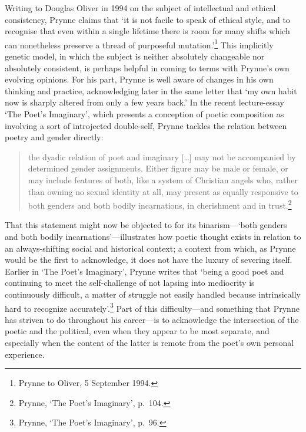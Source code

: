 \documentclass[]{article}
\begin{document}
Writing to Douglas Oliver in 1994 on the subject of intellectual and
ethical consistency, Prynne claims that ‘it is not facile to speak of
ethical style, and to recognise that even within a single lifetime there
is room for many shifts which can nonetheless preserve a thread of
purposeful mutation.’\footnote{Prynne to Oliver, 5 September 1994.} This
implicitly genetic model, in which the subject is neither absolutely
changeable nor absolutely consistent, is perhaps helpful in coming to
terms with Prynne’s own evolving opinions. For his part, Prynne is well
aware of changes in his own thinking and practice, acknowledging later
in the same letter that ‘my own habit now is sharply altered from only a
few years back.’ In the recent lecture-essay ‘The Poet’s Imaginary’,
which presents a conception of poetic composition as involving a sort of
introjected double-self, Prynne tackles the relation between poetry and
gender directly:

\begin{quote}
\singlespacing the dyadic relation of poet and imaginary {[}\ldots{}{]}
may not be accompanied by determined gender assignments. Either figure
may be male or female, or may include features of both, like a system of
Christian angels who, rather than owning no sexual identity at all, may
present as equally responsive to both genders and both bodily
incarnations, in cherishment and in trust.\footnote{Prynne, ‘The Poet’s
  Imaginary’, p.~104.}
\end{quote}

\noindent That this statement might now be objected to for its
binarism—‘both genders and both bodily incarnations’—illustrates how
poetic thought exists in relation to an always-shifting social and
historical context; a context from which, as Prynne would be the first
to acknowledge, it does not have the luxury of severing itself. Earlier
in ‘The Poet’s Imaginary’, Prynne writes that ‘being a good poet and
continuing to meet the self-challenge of not lapsing into mediocrity is
continuously difficult, a matter of struggle not easily handled because
intrinsically hard to recognize accurately’.\footnote{Prynne, ‘The
  Poet’s Imaginary’, p.~96.} Part of this difficulty—and something that
Prynne has striven to do throughout his career—is to acknowledge the
intersection of the poetic and the political, even when they appear to
be most separate, and especially when the content of the latter is
remote from the poet’s own personal experience.
\end{document}
